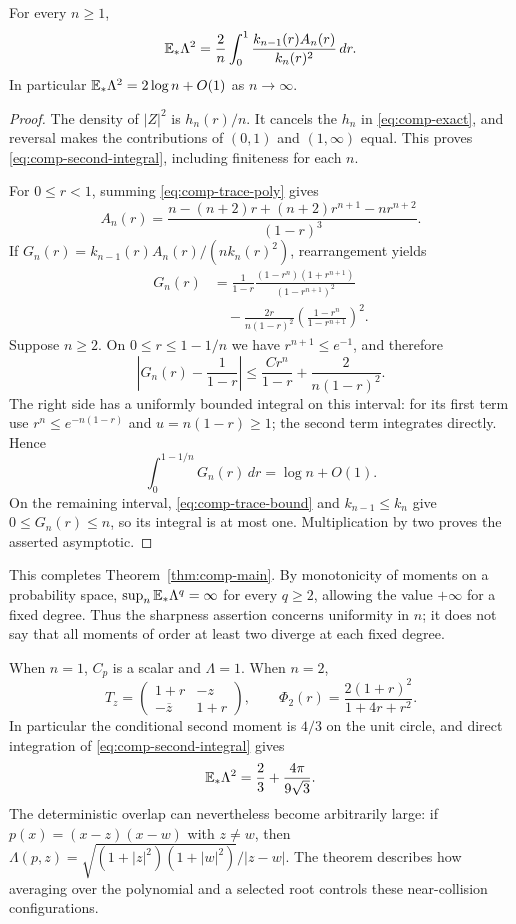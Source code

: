 \begin{proposition}\label{prop:comp-second}
For every $n\ge1$,
\begin{equation}\label{eq:comp-second-integral}
  \mathbb E_*\Lambda^2
  =\frac2n\int_0^1
       \frac{k_{n-1}(r)A_n(r)}{k_n(r)^2}\,dr.
\end{equation}
In particular $\mathbb E_*\Lambda^2=2\log n+O(1)$ as $n\to\infty$.
\end{proposition}

\begin{proof}
The density of $|Z|^2$ is $h_n(r)/n$.  It cancels the $h_n$ in
\eqref{eq:comp-exact}, and reversal makes the contributions of
$(0,1)$ and $(1,\infty)$ equal.  This proves
\eqref{eq:comp-second-integral}, including finiteness for each $n$.

For $0\le r<1$, summing \eqref{eq:comp-trace-poly} gives
\[
  A_n(r)=
  \frac{n-(n+2)r+(n+2)r^{n+1}-nr^{n+2}}{(1-r)^3}.
\]
If $G_n(r)=k_{n-1}(r)A_n(r)/(n k_n(r)^2)$, rearrangement yields
\begin{align*}
  G_n(r)
  &=\frac1{1-r}
    \frac{(1-r^n)(1+r^{n+1})}{(1-r^{n+1})^2}\\
  &\hspace{1em}
    -\frac{2r}{n(1-r)^2}
      \left(\frac{1-r^n}{1-r^{n+1}}\right)^2.
\end{align*}
Suppose $n\ge2$.  On $0\le r\le1-1/n$ we have
$r^{n+1}\le e^{-1}$, and therefore
\[
  \left|G_n(r)-\frac1{1-r}\right|
  \le\frac{Cr^n}{1-r}+\frac{2}{n(1-r)^2}.
\]
The right side has a uniformly bounded integral on this interval:
for its first term use $r^n\le e^{-n(1-r)}$ and
$u=n(1-r)\ge1$; the second term integrates directly.  Hence
\[
  \int_0^{1-1/n}G_n(r)\,dr=\log n+O(1).
\]
On the remaining interval, \eqref{eq:comp-trace-bound} and
$k_{n-1}\le k_n$ give $0\le G_n(r)\le n$, so its integral is at most
one.  Multiplication by two proves the asserted asymptotic.
\end{proof}

This completes Theorem~\ref{thm:comp-main}.  By monotonicity of moments
on a probability space, $\sup_n\mathbb E_*\Lambda^q=\infty$ for every
$q\ge2$, allowing the value $+\infty$ for a fixed degree.  Thus the
sharpness assertion concerns uniformity in $n$; it does not say that
all moments of order at least two diverge at each fixed degree.

\begin{example}\label{ex:comp-small}
When $n=1$, $C_p$ is a scalar and $\Lambda=1$.  When $n=2$,
\[
  T_z=\begin{pmatrix}1+r&-z\\-\overline z&1+r\end{pmatrix},
  \qquad
  \Phi_2(r)=\frac{2(1+r)^2}{1+4r+r^2}.
\]
In particular the conditional second moment is $4/3$ on the unit
circle, and direct integration of \eqref{eq:comp-second-integral}
gives
\[
  \mathbb E_*\Lambda^2=\frac23+\frac{4\pi}{9\sqrt3}.
\]
The deterministic overlap can nevertheless become arbitrarily large:
if $p(x)=(x-z)(x-w)$ with $z\ne w$, then
$\Lambda(p,z)=\sqrt{(1+|z|^2)(1+|w|^2)}/|z-w|$.
The theorem describes how averaging over the polynomial and a selected
root controls these near-collision configurations.
\end{example}

